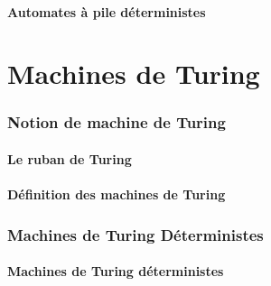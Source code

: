 \documentclass[9pt]{beamer}
\begin{document}
\subsection{Automates à pile déterministes}



 
 
\part{Machines de Turing}
 
 
\section{Notion de machine de Turing}
 
\subsection{Le ruban de Turing}




 
\subsection{Définition des machines de Turing}




 
\section{Machines de Turing Déterministes}
 
\subsection{Machines de Turing déterministes}






 
\end{document}
